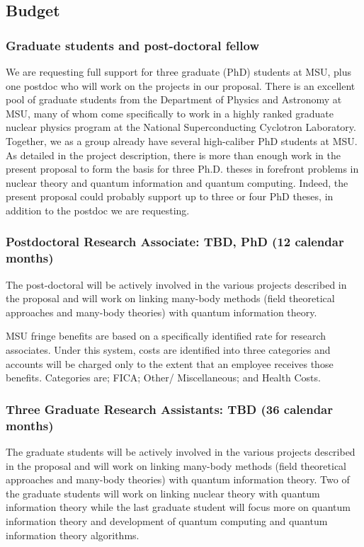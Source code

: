 \documentclass[10pt]{article}
\begin{document}
\subsection{Budget}
\subsubsection{Graduate students and post-doctoral fellow}

We are requesting full support for three graduate (PhD) students at MSU, plus one postdoc who will work on the projects in our proposal.  
There is an excellent pool of graduate students from the Department of Physics and Astronomy at MSU, many of whom come specifically to work in a highly ranked graduate nuclear physics program at the National Superconducting Cyclotron Laboratory. Together, we as a group already have several high-caliber PhD students at MSU.   As detailed in the project description, there is more than enough work in the present proposal to form the basis for three Ph.D. theses in forefront problems in nuclear theory and quantum information and quantum computing. Indeed, the present proposal could probably support up to three or four PhD theses, in addition to the postdoc we are requesting.

\subsubsection{Postdoctoral Research Associate: TBD, PhD (12 calendar months)}

The post-doctoral will be actively involved in the various projects described in the proposal and will work on linking many-body methods (field theoretical approaches and many-body theories) with quantum information theory. 

MSU fringe benefits are based on a specifically identified rate for research associates. Under this system, costs are identified into three categories and accounts will be charged only to the extent that an employee receives those benefits. Categories are; FICA; Other/ Miscellaneous; and Health Costs.

\subsubsection{Three Graduate Research Assistants: TBD (36 calendar months)}

The graduate students will be actively involved in the various projects described in the proposal and will work on linking many-body methods (field theoretical approaches and many-body theories) with quantum information theory. Two of the graduate students will work on linking nuclear theory with quantum information theory while the last graduate student will focus more on quantum information theory and development of quantum computing and quantum information theory algorithms.
\end{document}
